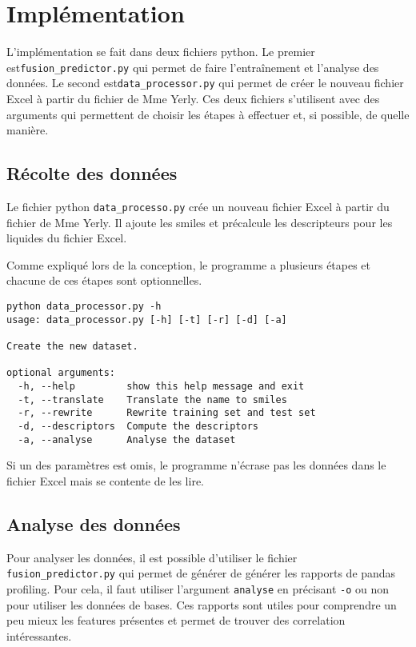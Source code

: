 \chapter{Implémentation}
\label{chap:implementation}
L'implémentation se fait dans deux fichiers python.
Le premier est\newline\texttt{fusion\_predictor.py}\cite{fusion_perdictor} qui permet de faire l'entraînement et l'analyse des données.
Le second est\newline\texttt{data\_processor.py}\cite{data_processor} qui permet de créer le nouveau fichier Excel à partir du fichier de Mme Yerly.
Ces deux fichiers s'utilisent avec des arguments qui permettent de choisir les étapes à effectuer et, si possible, de quelle manière.


\section{Récolte des données}
Le fichier python \texttt{data\_processo.py}\cite{data_processor} crée un nouveau fichier Excel à partir du fichier de Mme Yerly.
Il ajoute les \acrshort{smiles} et précalcule les descripteurs pour les liquides du fichier Excel.

Comme expliqué lors de la conception, le programme a plusieurs étapes et chacune de ces étapes sont optionnelles.
\begin{lstlisting}
python data_processor.py -h 
usage: data_processor.py [-h] [-t] [-r] [-d] [-a]

Create the new dataset.

optional arguments:
  -h, --help         show this help message and exit
  -t, --translate    Translate the name to smiles
  -r, --rewrite      Rewrite training set and test set
  -d, --descriptors  Compute the descriptors
  -a, --analyse      Analyse the dataset
\end{lstlisting}

Si un des paramètres est omis, le programme n'écrase pas les données dans le fichier Excel mais se contente de les lire.


\section{Analyse des données}
Pour analyser les données, il est possible d'utiliser le fichier \texttt{fusion\_predictor.py}\cite{fusion_perdictor} qui permet de générer de générer les rapports de pandas profiling.
Pour cela, il faut utiliser l'argument \texttt{analyse} en précisant \texttt{-o} ou non pour utiliser les données de bases.
Ces rapports sont utiles pour comprendre un peu mieux les features présentes et permet de trouver des correlation intéressantes.

